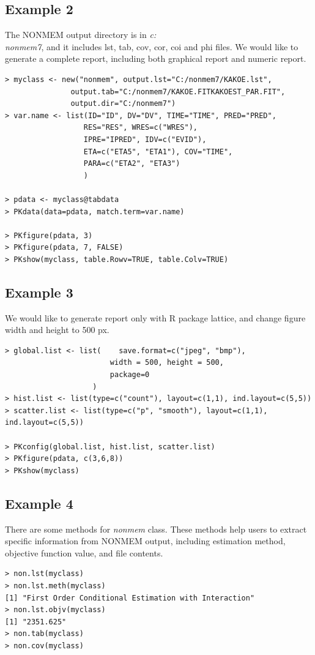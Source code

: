 \documentclass[a4paper]{article}
\begin{document}
\subsection{Example 2}
The NONMEM output directory is in \textit{c:\\nonmem7}, and it 
includes lst, tab, cov, cor, coi and phi files. 
We would like to generate a complete report, including both graphical report and numeric report.
\begin{verbatim}
> myclass <- new("nonmem", output.lst="C:/nonmem7/KAKOE.lst",
               output.tab="C:/nonmem7/KAKOE.FITKAKOEST_PAR.FIT",
               output.dir="C:/nonmem7")
> var.name <- list(ID="ID", DV="DV", TIME="TIME", PRED="PRED",
                  RES="RES", WRES=c("WRES"),
                  IPRE="IPRED", IDV=c("EVID"),
                  ETA=c("ETA5", "ETA1"), COV="TIME",
                  PARA=c("ETA2", "ETA3")
                  )

> pdata <- myclass@tabdata
> PKdata(data=pdata, match.term=var.name)

> PKfigure(pdata, 3)
> PKfigure(pdata, 7, FALSE)
> PKshow(myclass, table.Rowv=TRUE, table.Colv=TRUE)
\end{verbatim}

\subsection{Example 3}
We would like to generate report only with R package lattice, and change figure width and height to 500 px.
\begin{verbatim}
> global.list <- list(    save.format=c("jpeg", "bmp"),
                        width = 500, height = 500,
                        package=0
                    )
> hist.list <- list(type=c("count"), layout=c(1,1), ind.layout=c(5,5))
> scatter.list <- list(type=c("p", "smooth"), layout=c(1,1), ind.layout=c(5,5))

> PKconfig(global.list, hist.list, scatter.list)
> PKfigure(pdata, c(3,6,8))
> PKshow(myclass)
\end{verbatim}

\subsection{Example 4}
There are some methods for \textit{nonmem} class. These methods help users to extract specific information from NONMEM output, including estimation method, objective function value, and file contents.
\begin{verbatim}
> non.lst(myclass)
> non.lst.meth(myclass)
[1] "First Order Conditional Estimation with Interaction"
> non.lst.objv(myclass)
[1] "2351.625"
> non.tab(myclass)
> non.cov(myclass)
\end{verbatim}
\end{document}
